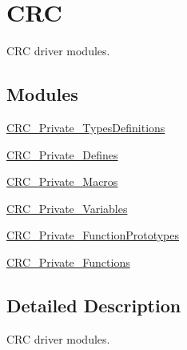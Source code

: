 \hypertarget{group___c_r_c}{\section{C\-R\-C}
\label{group___c_r_c}
}


C\-R\-C driver modules.  


\subsection*{Modules}
\begin{DoxyCompactItemize}
\item 
\hyperlink{group___c_r_c___private___types_definitions}{C\-R\-C\-\_\-\-Private\-\_\-\-Types\-Definitions}
\item 
\hyperlink{group___c_r_c___private___defines}{C\-R\-C\-\_\-\-Private\-\_\-\-Defines}
\item 
\hyperlink{group___c_r_c___private___macros}{C\-R\-C\-\_\-\-Private\-\_\-\-Macros}
\item 
\hyperlink{group___c_r_c___private___variables}{C\-R\-C\-\_\-\-Private\-\_\-\-Variables}
\item 
\hyperlink{group___c_r_c___private___function_prototypes}{C\-R\-C\-\_\-\-Private\-\_\-\-Function\-Prototypes}
\item 
\hyperlink{group___c_r_c___private___functions}{C\-R\-C\-\_\-\-Private\-\_\-\-Functions}
\end{DoxyCompactItemize}


\subsection{Detailed Description}
C\-R\-C driver modules. 